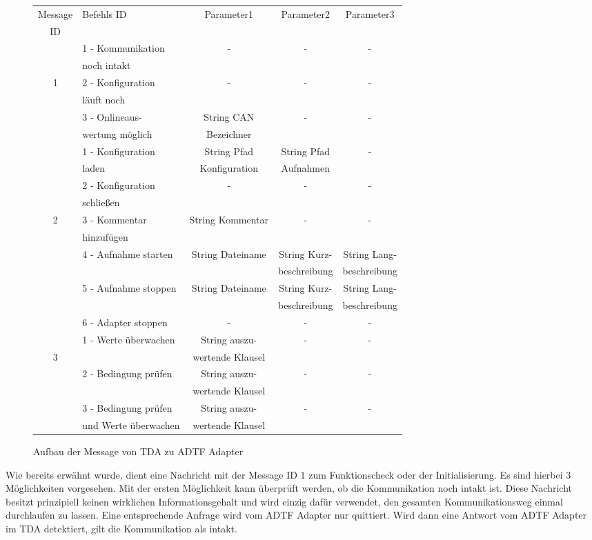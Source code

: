 \documentclass[12pt,a4paper]{report}
\begin{document}
\begin{figure}[H]
\begin{center}
\begin{tabular}{|c|l|*{3}{c|}}
\hline
Message & Befehls ID & Parameter1 & Parameter2 & Parameter3 \\
ID & & & & \\
\hline
\hline
 & 1 - Kommunikation & - & - & - \\
 & noch intakt & & & \\
1 & 2 - Konfiguration & - & - & - \\
 & läuft noch & & & \\
 & 3 - Onlineaus- & String CAN & - & - \\
 & wertung möglich & Bezeichner & & \\
\hline
 & 1 - Konfiguration & String Pfad& String Pfad & - \\
 & laden & Konfiguration & Aufnahmen & \\
 & 2 - Konfiguration & - & - & - \\
 & schlie\ss en & & & \\
2 & 3 - Kommentar & String Kommentar & - & - \\
 & hinzufügen &  & & \\
 & 4 - Aufnahme starten & String Dateiname & String Kurz- & String Lang- \\
 & &  & beschreibung & beschreibung\\
 & 5 - Aufnahme stoppen & String Dateiname & String Kurz- & String Lang- \\
 & &  & beschreibung & beschreibung \\
 & 6 - Adapter stoppen & - & - & - \\
\hline
 & 1 - Werte überwachen & String auszu- & - & - \\
3 &  & wertende Klausel & & \\
 & 2 - Bedingung prüfen & String auszu- & - & - \\
 & & wertende Klausel & & \\ 
 & 3 - Bedingung prüfen & String auszu- & - & - \\
 & und Werte überwachen & wertende Klausel & & \\
\hline
\end{tabular}
\caption{Aufbau der Message von TDA zu ADTF Adapter}\label{tab:Aufbau der Message TDA zu ADTF Adapter}
\end{center}
\end{figure}
\noindent Wie bereits erwähnt wurde, dient eine Nachricht mit der Message ID 1 zum Funktionscheck oder der Initialisierung. Es sind hierbei 3 Möglichkeiten vorgesehen. Mit der ersten Möglichkeit kann überprüft werden, ob die Kommunikation noch intakt ist. Diese Nachricht besitzt prinzipiell keinen wirklichen Informationsgehalt und wird einzig dafür verwendet, den gesamten Kommunikationsweg einmal durchlaufen zu lassen. Eine entsprechende Anfrage wird vom ADTF Adapter nur quittiert. Wird dann eine Antwort vom ADTF Adapter im TDA detektiert, gilt die Kommunikation als intakt.
\end{document}
